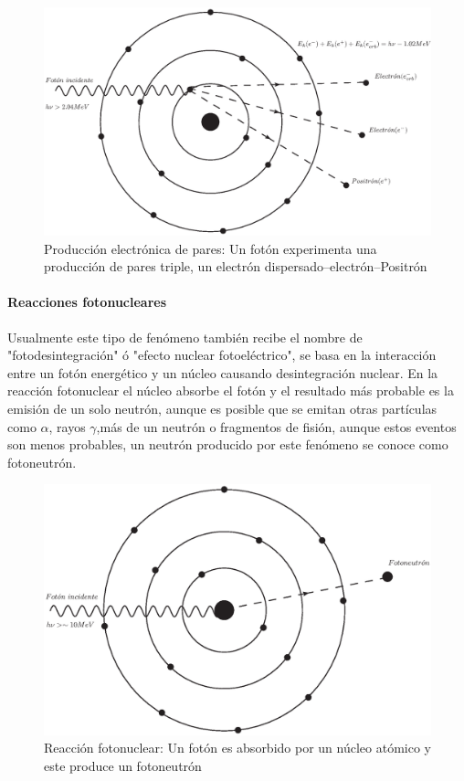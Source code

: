 \begin{figure}[htbp]
    \centering
    \includegraphics[width=.71\linewidth]{./Figures/electpp.eps}
    \caption[Producción electrónica de pares]{Producción electrónica de pares: Un fotón experimenta una producción de pares triple, un electrón dispersado--electrón--Positrón}
    \label{fig:PE}
\end{figure}

\paragraph{Reacciones fotonucleares}
 Usualmente este tipo de fenómeno también recibe el nombre de "fotodesintegración" ó "efecto nuclear fotoeléctrico", se basa en la interacción entre un fotón energético y un núcleo causando desintegración nuclear. En la reacción fotonuclear el núcleo absorbe el fotón y el resultado más probable es la emisión de un solo neutrón, aunque es posible que se emitan otras partículas como $\alpha$, rayos $\gamma$,más de un neutrón o fragmentos de fisión, aunque estos eventos son menos probables, un neutrón producido por este fenómeno se conoce como fotoneutrón\cite{Podgorsak}.

 \begin{figure}[htbp]
     \centering
     \includegraphics[width=.71\linewidth]{./Figures/fotoneu.eps}
     \caption[Reacción fotonuclear]{Reacción fotonuclear: Un fotón es absorbido por un núcleo atómico y este produce un fotoneutrón}
     \label{fig:RF}
 \end{figure}


